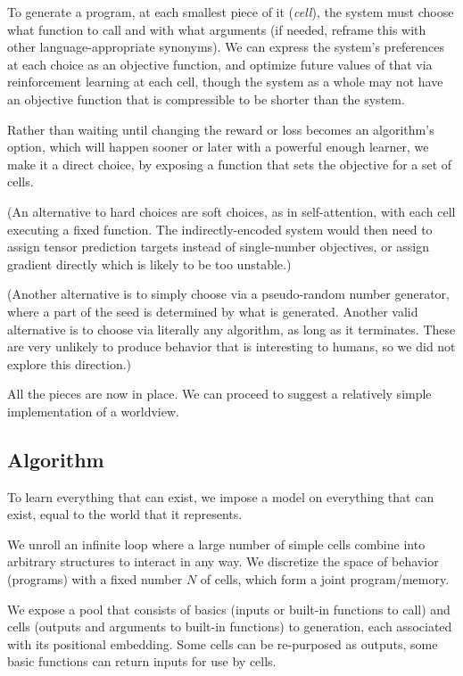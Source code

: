 \documentclass{article}
\begin{document}
To generate a program, at each smallest piece of it (\textit{cell}), the system must choose what function to call and with what arguments (if needed, reframe this with other language-appropriate synonyms). We can express the system's preferences at each choice as an objective function, and optimize future values of that via reinforcement learning at each cell, though the system as a whole may not have an objective function that is compressible to be shorter than the system.

Rather than waiting until changing the reward or loss becomes an algorithm's option, which will happen sooner or later with a powerful enough learner, we make it a direct choice, by exposing a function that sets the objective for a set of cells.

(An alternative to hard choices are soft choices, as in self-attention, with each cell executing a fixed function. The indirectly-encoded system would then need to assign tensor prediction targets instead of single-number objectives, or assign gradient directly which is likely to be too unstable.)

(Another alternative is to simply choose via a pseudo-random number generator, where a part of the seed is determined by what is generated. Another valid alternative is to choose via literally any algorithm, as long as it terminates. These are very unlikely to produce behavior that is interesting to humans, so we did not explore this direction.)

All the pieces are now in place. We can proceed to suggest a relatively simple implementation of a worldview.

\subsection{Algorithm\label{Algorithm}}

To learn everything that can exist, we impose a model on everything that can exist, equal to the world that it represents.

We unroll an infinite loop where a large number of simple cells combine into arbitrary structures to interact in any way. We discretize the space of behavior (programs) with a fixed number $N$ of cells, which form a joint program/memory.

We expose a pool that consists of basics (inputs or built-in functions to call) and cells (outputs and arguments to built-in functions) to generation, each associated with its positional embedding. Some cells can be re-purposed as outputs, some basic functions can return inputs for use by cells.
\end{document}
